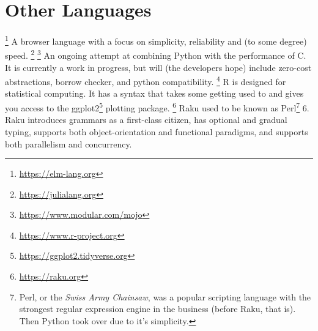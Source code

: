 \section{Other Languages}

\begin{itemize}
  \footnote{\url{https://elm-lang.org}} A  browser language with a focus on simplicity, reliability and (to some degree) speed.
  \footnote{\url{https://julialang.org}}
  \footnote{\url{https://www.modular.com/mojo}} An ongoing attempt at combining Python with the performance of C. It is currently a work in progress, but will (the developers hope) include zero-cost abstractions, borrow checker, and python compatibility.
  \footnote{\url{https://www.r-project.org}} R is designed for statistical computing. It has a syntax that takes some getting used to and gives you access to the ggplot2\footnote{\url{https://ggplot2.tidyverse.org}} plotting package.
  \footnote{\url{https://raku.org}} Raku used to be known as Perl\footnote{Perl, or the \textsl{Swiss Army Chainsaw}, was a popular scripting language with the strongest regular expression engine in the business (before Raku, that is). Then Python took over due to it's simplicity.} 6. Raku introduces grammars as a first-class citizen, has optional and gradual typing, supports both object-orientation and functional paradigms, and supports both parallelism and concurrency.
\end{itemize}
